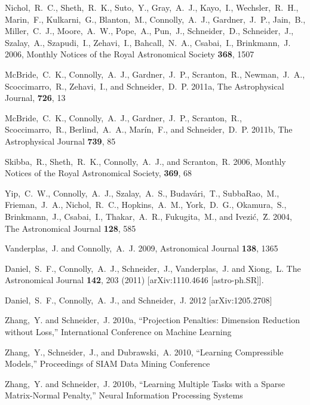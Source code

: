 \documentclass[prd,nofootbib,floatfix,11pt,tightenlines,nofootinbib]{revtex4}
\begin{document}
\begin{thebibliography}{99}
Nichol,~R.~C., Sheth,~R.~K., Suto,~Y., Gray,~A.~J., Kayo,~I., Wechsler,~R.~H.,
Marin,~F., Kulkarni,~G., Blanton,~M., Connolly,~A.~J., Gardner,~J.~P., Jain,~B.,
Miller,~C.~J., Moore,~A.~W., Pope,~A., Pun,~J., Schneider,~D., Schneider,~J.,
Szalay,~A., Szapudi,~I., Zehavi,~I., Bahcall,~N.~A., Csabai,~I., Brinkmann,~J.
2006, Monthly Notices of the Royal Astronomical Society {\bf 368}, 1507

McBride,~C.~K., Connolly,~A.~J., Gardner,~J.~P., Scranton,~R., Newman,~J.~A.,
Scoccimarro,~R., Zehavi,~I., and Schneider,~D.~P. 2011a, The Astrophysical
Journal, {\bf 726}, 13

McBride,~C.~K., Connolly,~A.~J., Gardner,~J.~P., Scranton,~R., Scoccimarro,~R.,
Berlind,~A.~A., Mar\'in,~F., and Schneider,~D.~P. 2011b, The Astrophysical
Journal {\bf 739}, 85

Skibba,~R., Sheth,~R.~K., Connolly,~A.~J., and Scranton,~R. 2006,
Monthly Notices of the Royal Astronomical Society, {\bf 369}, 68

Yip,~C.~W., Connolly,~A.~J., Szalay,~A.~S., Budav\'ari,~T., SubbaRao,~M.,
Frieman,~J.~A., Nichol,~R.~C., Hopkins,~A.~M., York,~D.~G., Okamura,~S.,
Brinkmann,~J., Csabai,~I., Thakar,~A.~R., Fukugita,~M., 
and Ivezi\'c,~\u Z. 2004, The Astronomical Journal {\bf 128}, 585

Vanderplas,~J. and Connolly,~A.~J. 2009,
Astronomical Journal {\bf 138}, 1365

  Daniel,~S.~F., Connolly,~A.~J., Schneider,~J., Vanderplas,~J. and Xiong,~L. 
  The Astronomical Journal  {\bf 142}, 203 (2011)
  [arXiv:1110.4646 [astro-ph.SR]].

Daniel,~S.~F., Connolly,~A.~J., and Schneider,~J. 2012
[arXiv:1205.2708]

Zhang,~Y. and Schneider,~J. 2010a, ``Projection Penalties: Dimension Reduction without
Loss,'' International Conference on Machine Learning

Zhang,~Y., Schneider,~J., and Dubrawski,~A. 2010,
``Learning Compressible Models,'' Proceedings of SIAM Data Mining Conference


Zhang,~Y. and Schneider,~J. 2010b,
``Learning Multiple Tasks with a Sparse Matrix-Normal Penalty,''
Neural Information Processing Systems



\end{thebibliography}
\end{document}
